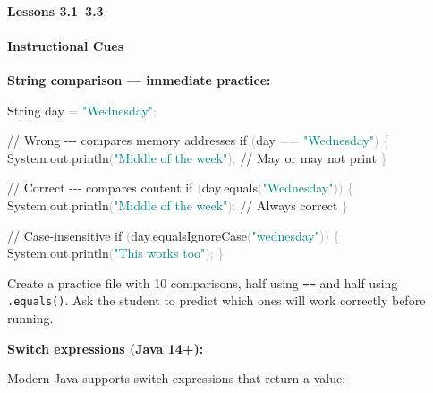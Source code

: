 \documentclass[
  justified,
  openright,
]{tufte-book}
\let\subsubsection\paragraph
\let\paragraph\paragraph
\newcommand{\BuiltInTok}[1]{#1}
\newcommand{\CommentTok}[1]{\textcolor{MidGray}{#1}}
\newcommand{\ControlFlowTok}[1]{\textcolor{BrandBlue}{#1}}
\newcommand{\FunctionTok}[1]{\textcolor{BrandBlue}{#1}}
\newcommand{\NormalTok}[1]{#1}
\newcommand{\OperatorTok}[1]{\textcolor{DarkGray}{#1}}
\newcommand{\StringTok}[1]{\textcolor{Teal}{#1}}
\newenvironment{Shaded}{%
  \begin{snugshade}
}{%
  \end{snugshade}
}
\let\subsubsection\paragraph
\let\paragraph\paragraph
\begin{document}
\subsubsection{Lessons 3.1--3.3}\label{lessons-3.13.3}

\paragraph{Instructional Cues}\label{instructional-cues-4}

\textbf{String comparison --- immediate practice:}

\begin{Shaded}
\begin{Highlighting}[]
\BuiltInTok{String}\NormalTok{ day }\OperatorTok{=} \StringTok{"Wednesday"}\OperatorTok{;}

\CommentTok{// Wrong {-}{-}{-} compares memory addresses}
\ControlFlowTok{if} \OperatorTok{(}\NormalTok{day }\OperatorTok{==} \StringTok{"Wednesday"}\OperatorTok{)} \OperatorTok{\{}
    \BuiltInTok{System}\OperatorTok{.}\FunctionTok{out}\OperatorTok{.}\FunctionTok{println}\OperatorTok{(}\StringTok{"Middle of the week"}\OperatorTok{);}  \CommentTok{// May or may not print}
\OperatorTok{\}}

\CommentTok{// Correct {-}{-}{-} compares content}
\ControlFlowTok{if} \OperatorTok{(}\NormalTok{day}\OperatorTok{.}\FunctionTok{equals}\OperatorTok{(}\StringTok{"Wednesday"}\OperatorTok{))} \OperatorTok{\{}
    \BuiltInTok{System}\OperatorTok{.}\FunctionTok{out}\OperatorTok{.}\FunctionTok{println}\OperatorTok{(}\StringTok{"Middle of the week"}\OperatorTok{);}  \CommentTok{// Always correct}
\OperatorTok{\}}

\CommentTok{// Case{-}insensitive}
\ControlFlowTok{if} \OperatorTok{(}\NormalTok{day}\OperatorTok{.}\FunctionTok{equalsIgnoreCase}\OperatorTok{(}\StringTok{"wednesday"}\OperatorTok{))} \OperatorTok{\{}
    \BuiltInTok{System}\OperatorTok{.}\FunctionTok{out}\OperatorTok{.}\FunctionTok{println}\OperatorTok{(}\StringTok{"This works too"}\OperatorTok{);}
\OperatorTok{\}}
\end{Highlighting}
\end{Shaded}

Create a practice file with 10 comparisons, half using \texttt{==} and
half using \texttt{.equals()}. Ask the student to predict which ones
will work correctly before running.

\textbf{Switch expressions (Java 14+):}

Modern Java supports switch expressions that return a value:
\end{document}
